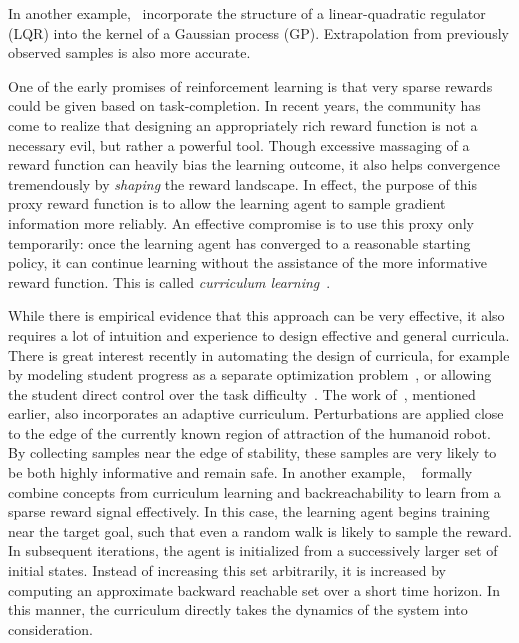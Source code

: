 In another example,~\textcite{marco2017design} incorporate the structure of a linear-quadratic regulator (LQR) into the kernel of a Gaussian process (GP). Extrapolation from previously observed samples is also more accurate. \par
One of the early promises of reinforcement learning is that very sparse rewards could be given based on task-completion. In recent years, the community has come to realize that designing an appropriately rich reward function is not a necessary evil, but rather a powerful tool. Though excessive massaging of a reward function can heavily bias the learning outcome, it also helps convergence tremendously by \emph{shaping} the reward landscape. In effect, the purpose of this proxy reward function is to allow the learning agent to sample gradient information more reliably. An effective compromise is to use this proxy only temporarily: once the learning agent has converged to a reasonable starting policy, it can continue learning without the assistance of the more informative reward function. This is called \emph{curriculum learning}~\cite{bengio2009curriculum,karpathy2012curriculum,heim2018shaping}. \par
While there is empirical evidence that this approach can be very effective, it also requires a lot of intuition and experience to design effective and general curricula. There is great interest recently in automating the design of curricula, for example by modeling student progress as a separate optimization problem~\cite{portelas2019teacher}, or allowing the student direct control over the task difficulty~\cite{klink2019self}. The work of~\textcite{kumar2018improving}, mentioned earlier, also incorporates an adaptive curriculum. Perturbations are applied close to the edge of the currently known region of attraction of the humanoid robot. By collecting samples near the edge of stability, these samples are very likely to be both highly informative and remain safe. In another example, ~\textcite{ivanovic2019barc} formally combine concepts from curriculum learning and backreachability to learn from a sparse reward signal effectively. In this case, the learning agent begins training near the target goal, such that even a random walk is likely to sample the reward. In subsequent iterations, the agent is initialized from a successively larger set of initial states. Instead of increasing this set arbitrarily, it is increased by computing an approximate backward reachable set over a short time horizon. In this manner, the curriculum directly takes the dynamics of the system into consideration. \par
